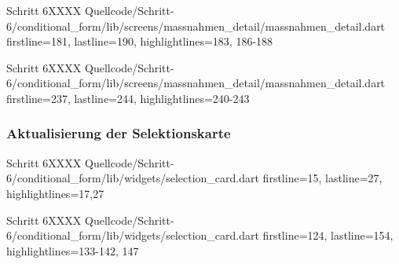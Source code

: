  
  \begin{alexlisting}{Schritt 6}{XXXX}
    {Quellcode/Schritt-6/conditional_form/lib/screens/massnahmen_detail/massnahmen_detail.dart}
    {firstline=181, lastline=190, highlightlines={183, 186-188}}
    \label{lst:Schritt6XXXXX}
  \end{alexlisting}


  \begin{alexlisting}{Schritt 6}{XXXX}
    {Quellcode/Schritt-6/conditional_form/lib/screens/massnahmen_detail/massnahmen_detail.dart}
    {firstline=237, lastline=244, highlightlines={240-243}}
    \label{lst:Schritt6XXXXX}
  \end{alexlisting}

  \subsubsection{Aktualisierung der Selektionskarte}



  \begin{alexlisting}{Schritt 6}{XXXX}
    {Quellcode/Schritt-6/conditional_form/lib/widgets/selection_card.dart}
    {firstline=15, lastline=27, highlightlines={17,27}}
    \label{lst:Schritt6XXXX}
\end{alexlisting}

\begin{alexlisting}{Schritt 6}{XXXX}
    {Quellcode/Schritt-6/conditional_form/lib/widgets/selection_card.dart}
    {firstline=124, lastline=154, highlightlines={133-142, 147}}
    \label{lst:Schritt6XXXX}
\end{alexlisting}

\ifincludeall \clearpage \fi 
